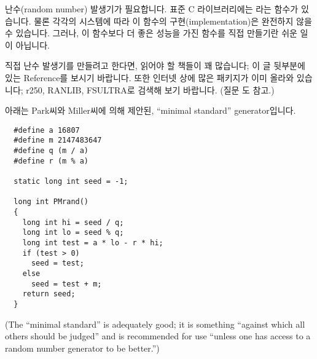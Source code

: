 \begin{faq}
	난수(random number) 발생기가 필요합니다.
\A
	표준 C 라이브러리에는 라는 함수가 있습니다.  물론
	각각의 시스템에 따라 이 함수의 구현(implementation)은 완전하지
	않을 수 있습니다.  그러나, 이 함수보다 더 좋은 성능을 가진 함수를
	직접 만들기란 쉬운 일이 아닙니다.

	직접 난수 발생기를 만들려고 한다면, 읽어야 할 책들이 꽤 많습니다;
	이 글 뒷부분에 있는 Reference를 보시기 바랍니다.
        또한 인터넷 상에 많은 패키지가 이미 올라와 있습니다;
	r250, RANLIB, FSULTRA로 검색해 보기 바랍니다.
        (질문 도 참고.)

        아래는 Park씨와 Miller씨에 의해 제안된, ``minimal standard''
        generator입니다.
\begin{verbatim}
  #define a 16807
  #define m 2147483647
  #define q (m / a)
  #define r (m % a)

  static long int seed = -1;

  long int PMrand()
  {
    long int hi = seed / q;
    long int lo = seed % q;
    long int test = a * lo - r * hi;
    if (test > 0)
      seed = test;
    else
      seed = test + m;
    return seed;
  }
\end{verbatim}
	\noindent (The ``minimal standard'' is adequately good; it is something
        ``against which all others should be judged'' and is recommended for
        use ``unless one has access to a random number generator 
        to be better.'')


\end{faq}
